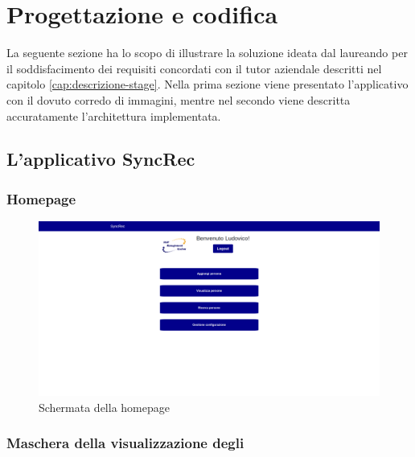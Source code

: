 
\chapter{Progettazione e codifica}
\label{cap:progettazione-codifica}

La seguente sezione ha lo scopo di illustrare la soluzione ideata dal laureando per il soddisfacimento dei requisiti concordati con il tutor aziendale descritti nel capitolo \ref{cap:descrizione-stage}. Nella prima sezione viene presentato l'applicativo con il dovuto corredo di immagini, mentre nel secondo viene descritta accuratamente l'architettura implementata.


\section{L'applicativo SyncRec}
\subsection{Homepage}
\vspace{0.5em}
\begin{figure}[!h] 
	\centering 
	\includegraphics[width=1\columnwidth]{immagini/svil/homepage} 
	\caption{Schermata della homepage}
	\label{figura:homepage}
\end{figure}

\subsection{Maschera della visualizzazione degli\applicant}

